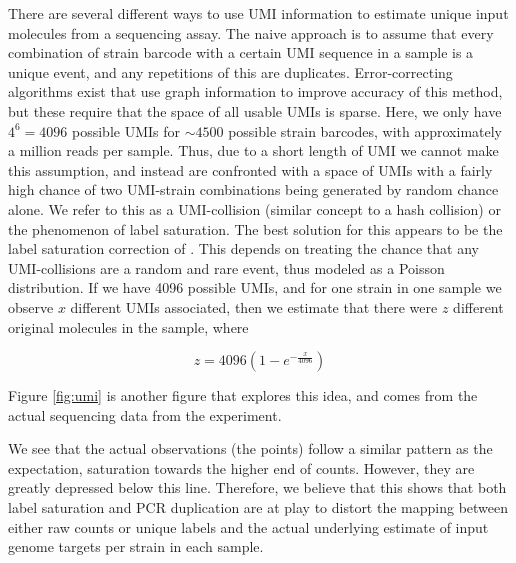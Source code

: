 There are several different ways to use UMI information to estimate
unique input molecules from a sequencing assay. The naive approach is to
assume that every combination of strain barcode with a certain UMI
sequence in a sample is a unique event, and any repetitions of this are
duplicates. Error-correcting algorithms 
exist that use graph information to improve accuracy of this method, but
these require that the space of all usable UMIs is sparse. Here, we only
have \(4^6=4096\) possible UMIs for \(\sim4500\) possible strain
barcodes, with approximately a million reads per sample. Thus, due to a
short length of UMI we cannot make this assumption, and instead are
confronted with a space of UMIs with a fairly high chance of two
UMI-strain combinations being generated by random chance alone. We refer
to this as a UMI-collision (similar concept to a hash collision) or the
phenomenon of label saturation. The best solution for this appears to be
the label saturation correction of \cite{fu2011counting}. This depends
on treating the chance that any UMI-collisions are a random and rare
event, thus modeled as a Poisson distribution. If we have 4096 possible
UMIs, and for one strain in one sample we observe \(x\) different UMIs
associated, then we estimate that there were \(z\) different original
molecules in the sample, where

\[z=4096 (1-e^{-\frac{x}{4096}})\]

Figure \ref{fig:umi} is another figure that explores this idea, and
comes from the actual sequencing data from the experiment.


We see that the actual observations (the points) follow a similar
pattern as the expectation, saturation towards the higher end of counts.
However, they are greatly depressed below this line. Therefore, we
believe that this shows that both label saturation and PCR duplication
are at play to distort the mapping between either raw counts or unique
labels and the actual underlying estimate of input genome targets per
strain in each sample.


